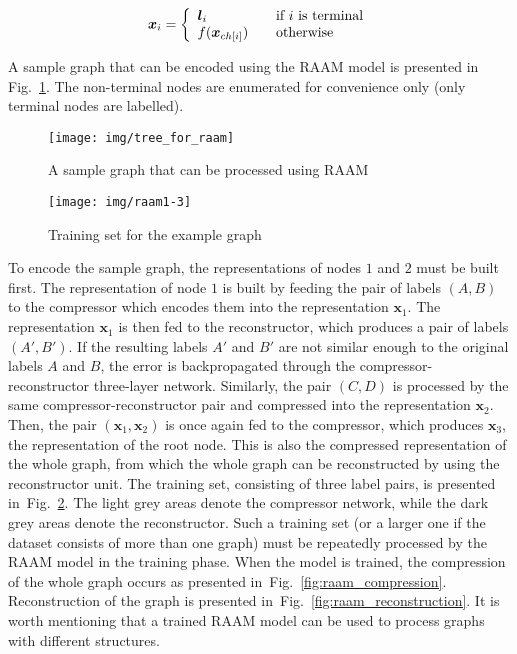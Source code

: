 \begin{equation}
\bm{x}_i = \left\{
\begin{array}{l l}
	\bm{l}_i & \quad \text{if $i$ is terminal} \\
	f(\bm{x}_{ch[i]}) & \quad \text{otherwise}
\end{array}
\right.
\label{eq:raam_representation}
\end{equation}

\noindent A sample graph that can be encoded using the RAAM model is presented in Fig.~\ref{fig:tree_for_raam}. The non-terminal nodes are enumerated for convenience only (only terminal nodes are labelled).

\begin{figure}
\begin{center}
	\texttt{[image: img/tree\_for\_raam]}
	\caption{A sample graph that can be processed using RAAM}
	\label{fig:tree_for_raam}
\end{center}
\end{figure}

\begin{figure}
\begin{center}
	\texttt{[image: img/raam1-3]}
	\caption{Training set for the example graph}
	\label{fig:raam1-3}
\end{center}
\end{figure}

To encode the sample graph, the representations of nodes $1$ and $2$ must be built first. The representation of node $1$ is built by feeding the pair of labels $(A, B)$ to the compressor which encodes them into the representation $\bm{x}_1$. The representation $\bm{x}_1$ is then fed to the reconstructor, which produces a pair of labels $(A', B')$. If the resulting labels $A'$ and $B'$ are not similar enough to the original labels $A$ and $B$, the error is backpropagated through the compressor-reconstructor three-layer network. Similarly, the pair $(C, D)$ is processed by the same compressor-reconstructor pair and compressed into the representation $\bm{x}_2$. Then, the pair $(\bm{x}_1, \bm{x}_2)$ is once again fed to the compressor, which produces $\bm{x}_3$, the representation of the root node. This is also the compressed representation of the whole graph, from which the whole graph can be reconstructed by using the reconstructor unit. The training set, consisting of three label pairs, is presented in~Fig.~\ref{fig:raam1-3}. The light grey areas denote the compressor network, while the dark grey areas denote the reconstructor. Such a training set (or a larger one if the dataset consists of more than one graph) must be repeatedly processed by the RAAM model in the training phase. When the model is trained, the compression of the whole graph occurs as presented in~Fig.~\ref{fig:raam_compression}. Reconstruction of the graph is presented in~Fig.~\ref{fig:raam_reconstruction}. It is worth mentioning that a trained RAAM model can be used to process graphs with different structures.


